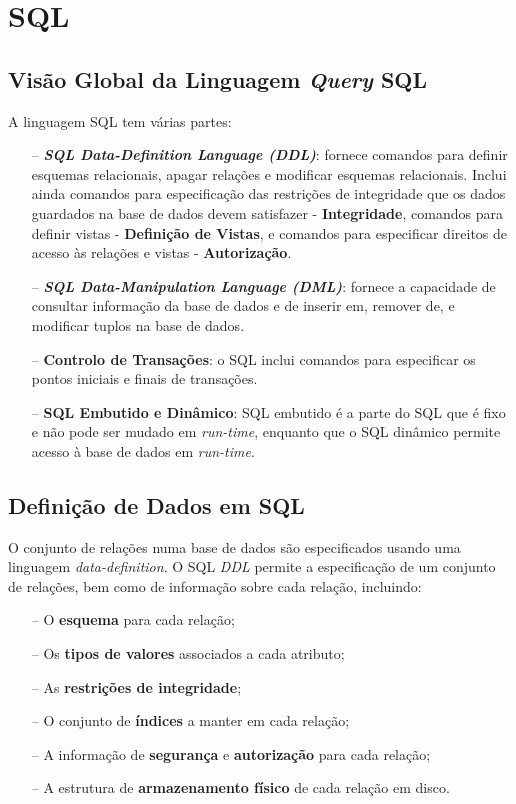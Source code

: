 \documentclass[titlepage]{book}
\theoremstyle{definition}
\begin{document}
\chapter{SQL}

\section{Visão Global da Linguagem \textit{Query} SQL}
A linguagem SQL tem várias partes:
\begin{itemize}
    \itemsep0cm
    \item[--]\textbf{\textit{SQL Data-Definition Language (DDL)}}: fornece comandos para definir esquemas relacionais, apagar relações e modificar esquemas relacionais. Inclui ainda comandos para especificação das restrições de integridade que os dados guardados na base de dados devem satisfazer - \textbf{Integridade}, comandos para definir vistas - \textbf{Definição de Vistas}, e comandos para especificar direitos de acesso às relações e vistas - \textbf{Autorização}.
    \item[--]\textbf{\textit{SQL Data-Manipulation Language (DML)}}: fornece a capacidade de consultar informação da base de dados e de inserir em, remover de, e modificar tuplos na base de dados.
    \item[--]\textbf{Controlo de Transações}: o SQL inclui comandos para especificar os pontos iniciais e finais de transações.
    \item[--]\textbf{SQL Embutido e Dinâmico}: SQL embutido é a parte do SQL que é fixo e não pode ser mudado em \textit{run-time}, enquanto que o SQL dinâmico permite acesso à base de dados em \textit{run-time}.
\end{itemize}

\section{Definição de Dados em SQL}
O conjunto de relações numa base de dados são especificados usando uma linguagem \textit{data-definition}. 
O SQL \textit{DDL} permite a especificação de um conjunto de relações, bem como de informação sobre cada relação, incluindo:
\begin{itemize}
    \itemsep0cm
    \item[--]O \textbf{esquema} para cada relação;
    \item[--]Os \textbf{tipos de valores} associados a cada atributo;
    \item[--]As \textbf{restrições de integridade};
    \item[--]O conjunto de \textbf{índices} a manter em cada relação;
    \item[--]A informação de \textbf{segurança} e \textbf{autorização} para cada relação;
    \item[--]A estrutura de \textbf{armazenamento físico} de cada relação em disco.
\end{itemize}
\end{document}

